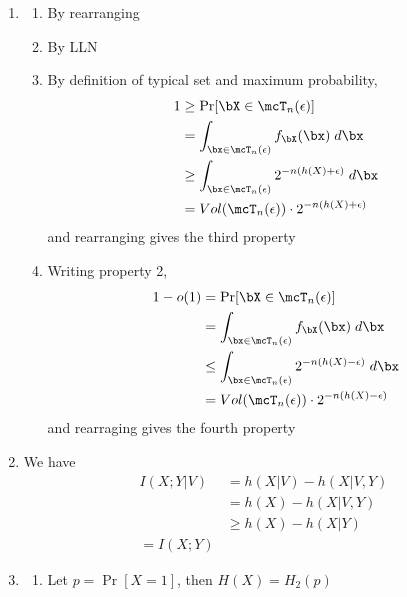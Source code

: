 \documentclass[12pt, a4paper]{article}
\begin{document}
\begin{enumerate}
  \item 
    \begin{enumerate}
      \item By rearranging 

      \item By LLN 

      \item By definition of typical set and maximum probability,
        \begin{align*}
          1 &\geq \Pr[\bX \in \mcT_n(\epsilon)]\\ 
            &= \int_{\bx\in\mcT_n(\epsilon)} f_{\bX}(\bx)\;d\bx \\ 
            &\geq \int_{\bx\in\mcT_n(\epsilon)} 2^{-n(h(X)+ \epsilon)}\;d\bx \\ 
            &= Vol(\mcT_n(\epsilon))\cdot 2^{-n(h(X) + \epsilon)}
        \end{align*}
        and rearranging gives the third property 

      \item Writing property 2,
        \begin{align*}
          1-o(1) &= \Pr[\bX \in \mcT_n(\epsilon)]\\ 
            &= \int_{\bx\in\mcT_n(\epsilon)} f_{\bX}(\bx)\;d\bx \\ 
            &\leq \int_{\bx\in\mcT_n(\epsilon)} 2^{-n(h(X)- \epsilon)}\;d\bx \\ 
            &= Vol(\mcT_n(\epsilon))\cdot 2^{-n(h(X) - \epsilon)}
        \end{align*}
        and rearraging gives the fourth property
    \end{enumerate}

  \item We have
    \begin{align*}
      I(X;Y|V) &= h(X|V) - h(X|V,Y)\\ 
               &= h(X) - h(X|V,Y)\\ 
               &\geq h(X) - h(X|Y)\tag*{(Conditioning red. entropy)}\\
               = I(X;Y)
    \end{align*}

  \item 
    \begin{enumerate}
  \item Let $p = \Pr[X=1]$, then $H(X) = H_2(p)$ 


\end{enumerate}
\end{enumerate}
\end{document}
